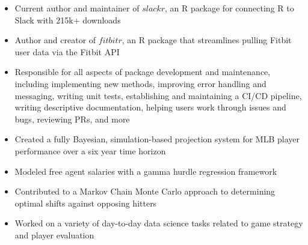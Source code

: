 \documentclass[10pt,a4paper,ragged2e,withhyper]{/Users/matt/documents/GitHub/mrkaye97.github.io/resume/altacv}
\begin{document}
		
		\begin{itemize}
		\item Current author and maintainer of $slackr$, an R package for connecting R to Slack with 215k+ downloads
		\item Author and creator of $fitbitr$, an R package that streamlines pulling Fitbit user data via the Fitbit API
		\item Responsible for all aspects of package development and maintenance, including implementing new methods, improving error handling and messaging, writing unit tests, establishing and maintaining a CI/CD pipeline, writing descriptive documentation, helping users work through issues and bugs, reviewing PRs, and more
		\end{itemize}
		
		\divider

		\begin{itemize}
		\item Created a fully Bayesian, simulation-based projection system for MLB player performance over a six year time horizon
		\item Modeled free agent salaries with a gamma hurdle regression framework
		\item Contributed to a Markov Chain Monte Carlo approach to determining optimal shifts against opposing hitters
		\item Worked on a variety of day-to-day data science tasks related to game strategy and player evaluation
		\end{itemize}
\end{document}
